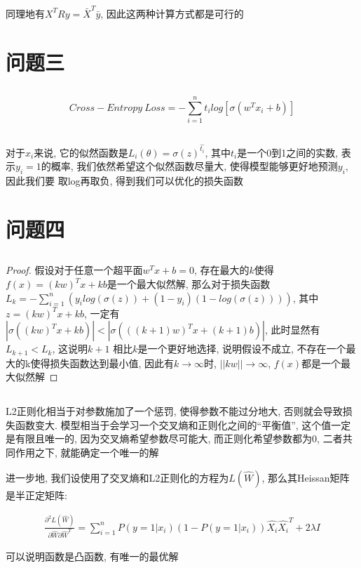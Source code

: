 \documentclass[12pt, a4paper]{article}
\begin{document}
同理地有$X^TRy = \bar{X}^T \bar{y}$, 因此这两种计算方式都是可行的

\section{问题三}


\subsection{}

\begin{equation*}
    Cross-Entropy \ Loss = - \sum_{i=1}^n t_i log[\sigma(w^T x_i + b)]
\end{equation*}

\subsection{}

对于$x_i$来说, 它的似然函数是$L_i(\theta) = \sigma(z)^{\hat{t_i}} $, 其中$t_i$是一个0到1之间的实数, 表示$y_i=1$的概率, 
我们依然希望这个似然函数尽量大, 使得模型能够更好地预测$y_i$, 因此我们要
取log再取负, 得到我们可以优化的损失函数

\section{问题四}


\subsection{}

\newtheorem*{proof}{Proof}

\begin{proof}
    假设对于任意一个超平面$w^T x + b = 0$, 存在最大的$k$使得$f(x) = (kw)^T x + kb$是一个最大似然解, 
    那么对于损失函数$L_k = - \sum_{i=1}^n(y_i log(\sigma(z))+(1-y_i)(1-log(\sigma(z))))$, 其中$z = (kw)^T x + kb$, 
    一定有$|\sigma((kw)^T x + kb)| < |\sigma(((k+1)w)^T x + (k+1)b)|$, 此时显然有$L_{k+1}<L_k$, 这说明$k+1$
    相比$k$是一个更好地选择, 说明假设不成立, 不存在一个最大的k使得损失函数达到最小值, 因此有$k \rightarrow \infty$时, 
    $||kw|| \rightarrow \infty$, $f(x)$都是一个最大似然解
\end{proof}

\subsection{}

L2正则化相当于对参数施加了一个惩罚, 使得参数不能过分地大, 否则就会导致损失函数变大. 
模型相当于会学习一个交叉熵和正则化之间的“平衡值”, 这个值一定是有限且唯一的,
因为交叉熵希望参数尽可能大, 而正则化希望参数都为0, 二者共同作用之下, 就能确定一个唯一的解

进一步地, 我们设使用了交叉熵和L2正则化的方程为$L(\hat{W})$, 那么其Heissan矩阵是半正定矩阵:

\begin{align*}
    \frac{\partial^2L(\hat{W})}{\partial \hat{W} \partial \hat{W}^T} = 
    \sum_{i=1}^n P(y=1|x_i)(1-P(y=1|x_i))\hat{X_i} \hat{X_i}^T + 2 \lambda I
\end{align*}

可以说明函数是凸函数, 有唯一的最优解
\end{document}
